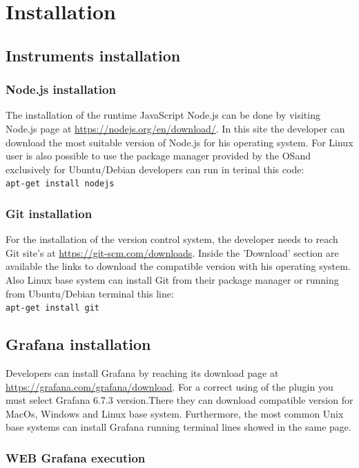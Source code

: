 \section{Installation}

\subsection{Instruments installation}

\subsubsection{Node.js installation}
The installation of the runtime JavaScript Node.js can be done by visiting  Node.js page at \url{https://nodejs.org/en/download/}. In this site the developer can download the most suitable version of Node.js for his operating system. For Linux user is also possible to use the package manager provided by the OS\glo and exclusively for Ubuntu/Debian developers can run in terinal this code:\\
\texttt{apt-get install nodejs} \\

\subsubsection{Git installation}
For the installation of the version control system, the developer needs to reach Git site's at \url{https://git-scm.com/downloads}. Inside the 'Download' section are available the links to download the compatible version with his operating system. Also Linux base system  can install Git from their package manager or running from Ubuntu/Debian terminal this line:\\
\texttt{apt-get install git} \\

\subsection{Grafana installation}
Developers can install Grafana by reaching its download page at \url{https://grafana.com/grafana/download}. For a correct using of the plugin you must select Grafana 6.7.3 version.There they can download compatible version for MacOs, Windows and Linux base system. Furthermore, the most common Unix base systems can install Grafana running terminal lines showed in the same page.

\subsubsection{WEB Grafana execution}

